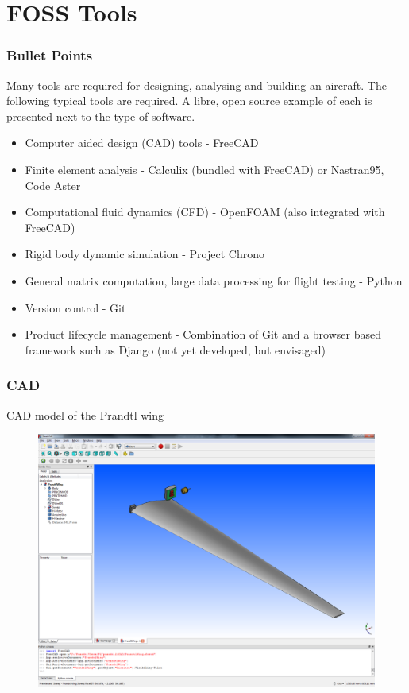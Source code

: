 \documentclass{beamer}
\begin{document}
\section{FOSS Tools}


\begin{frame}
\frametitle{Bullet Points}

Many tools are required for designing, analysing and building an aircraft.  The following typical tools are required.  A libre, open source example of each is presented next to the type of software.

\begin{itemize}
\item Computer aided design (CAD) tools - FreeCAD
\item Finite element analysis - Calculix (bundled with FreeCAD) or Nastran95, Code Aster
\item Computational fluid dynamics (CFD) - OpenFOAM (also integrated with FreeCAD)
\item Rigid body dynamic simulation - Project Chrono
\item General matrix computation, large data processing for flight testing - Python
\item Version control - Git
\item Product lifecycle management - Combination of Git and a browser based framework such as Django (not yet developed, but envisaged)
\end{itemize}
\end{frame}

\begin{frame}
\frametitle{CAD}

CAD model of the Prandtl wing

\begin{figure}
        \includegraphics[width=0.7\linewidth]{Pictures/Prandtl2FreeCAD.png}
\end{figure}

\end{frame}
\end{document}
